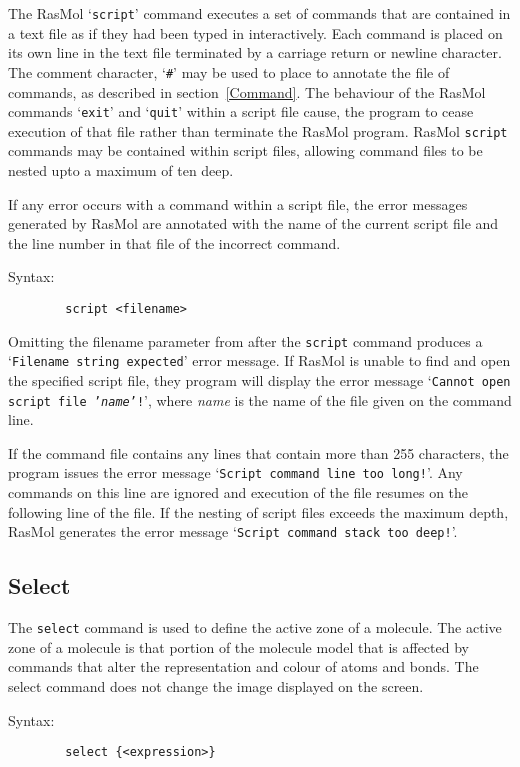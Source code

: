 The RasMol `{\tt script}' command executes a set of commands that are 
contained in a text file as if they had been typed in interactively. Each
command is placed on its own line in the text file terminated by a 
carriage return or newline character. The comment character, `{\tt \#}'
may be used to place to annotate the file of commands, as described in
section~\ref{Command}. The behaviour of the RasMol commands `{\tt exit}'
and `{\tt quit}' within a script file cause, the program to cease 
execution of that file rather than terminate the RasMol program. RasMol
{\tt script} commands may be contained within script files, allowing
command files to be nested upto a maximum of ten deep.

If any error occurs with a command within a script file, the error 
messages generated by RasMol are annotated with the name of the current
script file and the line number in that file of the incorrect command.

Syntax:
\begin{verbatim}
        script <filename>
\end{verbatim}

Omitting the filename parameter from after the {\tt script} command
produces a `{\tt Filename string expected}' error message. If RasMol is 
unable to find and open the specified script file, they program will 
display the error message `{\tt Cannot open script file '{\rm\it name}'!}', 
where {\it name} is the name of the file given on the command line.

If the command file contains any lines that contain more than 255
characters, the program issues the error message `{\tt Script command
line too long!}'. Any commands on this line are ignored and execution
of the file resumes on the following line of the file. If the nesting
of script files exceeds the maximum depth, RasMol generates the error
message `{\tt Script command stack too deep!}'.


\subsection{Select}
\label{CSelect}
The {\tt select} command is used to define the active zone of a molecule. The 
active zone of a molecule is that portion of the molecule model that is
affected by commands that alter the representation and colour of atoms
and bonds. The select command does not change the image displayed on the
screen.

Syntax:
\begin{verbatim}
        select {<expression>}
\end{verbatim}



